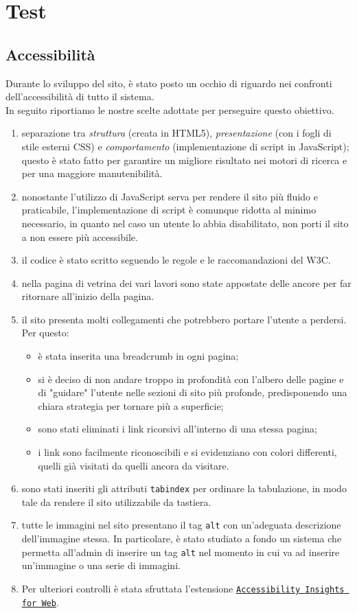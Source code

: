 \section{Test}
\subsection{Accessibilità}
Durante lo sviluppo del sito, è stato posto un occhio di riguardo nei confronti dell'accessibilità di tutto il sistema.\\In seguito riportiamo le nostre scelte adottate per perseguire questo obiettivo.
\begin{enumerate}
	\item separazione tra \textit{struttura} (creata in HTML5), \textit{presentazione} (con i fogli di stile esterni CSS) e \textit{comportamento} (implementazione di script in JavaScript); \\questo è stato fatto per garantire un migliore risultato nei motori di ricerca e per una maggiore manutenibilità.
	
	\item nonostante l'utilizzo di JavaScript serva per rendere il sito più fluido e praticabile, l'implementazione di script è comunque ridotta al minimo necessario, in quanto nel caso un utente lo abbia disabilitato, non porti il sito a non essere più accessibile.
	\item il codice è stato scritto seguendo le regole e le raccomandazioni del W3C.
	\item nella pagina di vetrina dei vari lavori sono state appostate delle ancore per far ritornare all'inizio della pagina.
	\item il sito presenta molti collegamenti che potrebbero portare l'utente a perdersi. Per questo: 
	\begin{itemize}
	\item è stata inserita una breadcrumb in ogni pagina;
	\item si è deciso di non andare troppo in profondità con l'albero delle pagine e di "guidare" l'utente nelle sezioni di sito più profonde, predisponendo una chiara strategia per tornare più a superficie;
	\item sono stati eliminati i link ricorsivi all'interno di una stessa pagina;
	\item i link sono facilmente riconoscibili e si evidenziano con colori differenti, quelli già visitati da quelli ancora da visitare.
	\end{itemize}	
	\item sono stati inseriti gli attributi \texttt{tabindex} per ordinare la tabulazione, in modo tale da rendere il sito utilizzabile da tastiera.
	\item tutte le immagini nel sito presentano il tag \texttt{alt} con un'adeguata descrizione dell'immagine stessa. In particolare, è stato studiato a fondo un sistema che permetta all'admin di inserire un tag \texttt{alt} nel momento in cui va ad inserire un'immagine o una serie di immagini.
	\item Per ulteriori controlli è stata sfruttata l'estensione \href{https://chrome.google.com/webstore/detail/accessibility-insights-fo/pbjjkligggfmakdaogkfomddhfmpjeni}{\texttt{Accessibility Insights for Web}}.
\end{enumerate}
